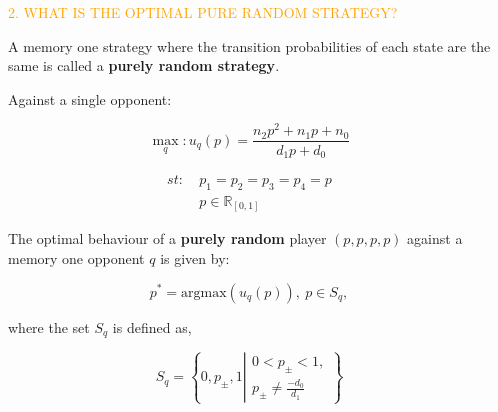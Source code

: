 \documentclass[usenames,dvipsnames,t]{beamer}
\newcommand{\R}{\mathbb{R}}
\begin{document}
\begin{columns}
    \begin{column}{.05\linewidth}
    \end{column}
    \begin{column}{.45\linewidth}
        \vspace{0.5cm}

        \begin{center}
        \textcolor{orange}{\large{2. WHAT IS THE OPTIMAL PURE RANDOM STRATEGY?}}
        \end{center}
        \vspace{0.3cm}

        \small{
        A memory one strategy where the transition probabilities of each
        state are the same is called a \textbf{purely random strategy}.}
        \vspace{0.5cm}

        \textcolor{solarizedGreen}{Against a single opponent:}
        \vspace{0.3cm}

        \[ \max_q: u_q(p) = \frac{n_2p^2 + n_1p +n_0 } {d_1p + d_0}\]
        \vspace{0.3cm}

        \begin{equation*}
            \begin{aligned}
                st: & \ p_1 = p_2 = p_3 = p_4 = p\\
                & \ p \in \R_{[0, 1]} 
            \end{aligned}
        \end{equation*}
        \vspace{0.3cm}

        \small{
        The optimal behaviour of a \textbf{purely random} player \((p, p, p, p)\)
        against a memory one opponent \(q\) is given by:}
        
        \[p^* = \text{argmax}(u_q(p)), \ p \in S_q,\]
        \vspace{0.3cm}

        \small{
        where the set \(S_q\) is defined as,}
        
        \[S_q = \left \{0, p_{\pm}, 1 \left | \begin{array}{l} 0 < p_{\pm} < 1,
            \\ p_{\pm} \neq \frac{-d_0}{d_1} \end{array} \right. \right\}\]
        \vspace{0.5cm}
        

\end{column}
\end{columns}
\end{document}
